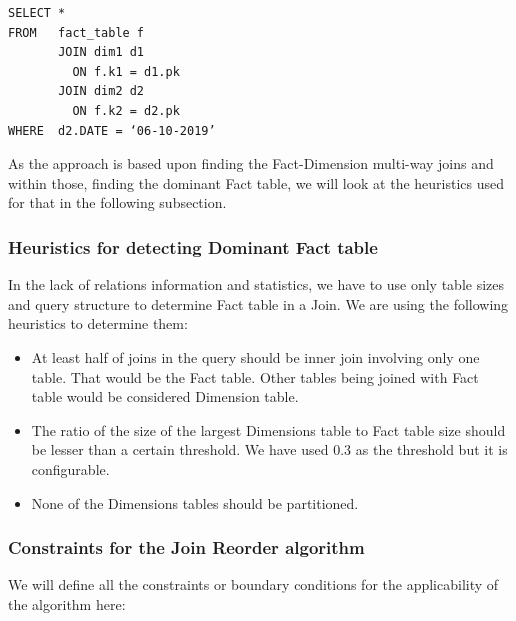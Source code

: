 \begin{verbatim}
SELECT * 
FROM   fact_table f 
       JOIN dim1 d1 
         ON f.k1 = d1.pk 
       JOIN dim2 d2 
         ON f.k2 = d2.pk 
WHERE  d2.DATE = ‘06-10-2019’ 
\end{verbatim}

As the approach is based upon finding the Fact-Dimension multi-way joins and within those, finding the dominant Fact table, we will look at the heuristics used for that in the following subsection.

\subsubsection{Heuristics for detecting Dominant Fact table}
In the lack of relations information and statistics, we have to use only table sizes and query structure to determine Fact table in a Join. We are using the following heuristics to determine them:

\begin{itemize}
\item At least half of joins in the query should be inner join involving only one table. That would be the Fact table. Other tables being joined with Fact table would be considered Dimension table.
\item The ratio of the size of the largest Dimensions table to Fact table size should be lesser than a certain threshold. We have used 0.3 as the threshold but it is configurable.
\item None of the Dimensions tables should be partitioned.
\end{itemize}

\subsubsection{Constraints for the Join Reorder algorithm}
We will define all the constraints or boundary conditions for the applicability of the algorithm here:

